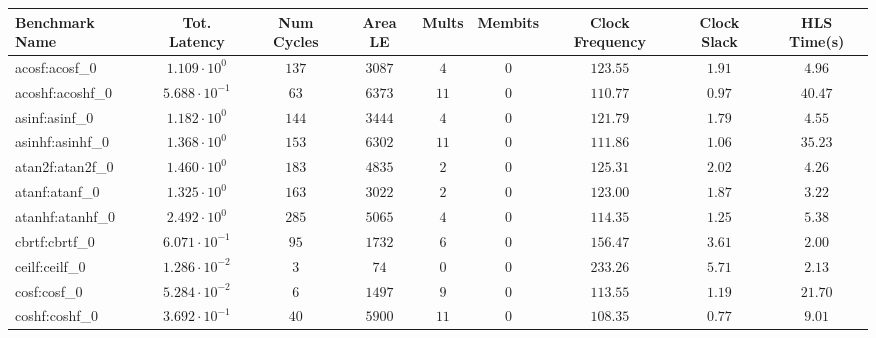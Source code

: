 \begin{tabular}{|l|c|c|c|c|c|c|c|c|}
\hline
Benchmark Name               & Tot. Latency            & Num Cycles & Area LE    & Mults   & Membits    & Clock Frequency & Clock Slack & HLS Time(s) \\
\hline
acosf:acosf\_0               & $ 1.109 \cdot 10^{0}  $ & $ 137    $ & $ 3087   $ & $ 4   $ & $ 0      $ & $ 123.55      $ & $ 1.91    $ & $ 4.96    $ \\
acoshf:acoshf\_0             & $ 5.688 \cdot 10^{-1} $ & $ 63     $ & $ 6373   $ & $ 11  $ & $ 0      $ & $ 110.77      $ & $ 0.97    $ & $ 40.47   $ \\
asinf:asinf\_0               & $ 1.182 \cdot 10^{0}  $ & $ 144    $ & $ 3444   $ & $ 4   $ & $ 0      $ & $ 121.79      $ & $ 1.79    $ & $ 4.55    $ \\
asinhf:asinhf\_0             & $ 1.368 \cdot 10^{0}  $ & $ 153    $ & $ 6302   $ & $ 11  $ & $ 0      $ & $ 111.86      $ & $ 1.06    $ & $ 35.23   $ \\
atan2f:atan2f\_0             & $ 1.460 \cdot 10^{0}  $ & $ 183    $ & $ 4835   $ & $ 2   $ & $ 0      $ & $ 125.31      $ & $ 2.02    $ & $ 4.26    $ \\
atanf:atanf\_0               & $ 1.325 \cdot 10^{0}  $ & $ 163    $ & $ 3022   $ & $ 2   $ & $ 0      $ & $ 123.00      $ & $ 1.87    $ & $ 3.22    $ \\
atanhf:atanhf\_0             & $ 2.492 \cdot 10^{0}  $ & $ 285    $ & $ 5065   $ & $ 4   $ & $ 0      $ & $ 114.35      $ & $ 1.25    $ & $ 5.38    $ \\
cbrtf:cbrtf\_0               & $ 6.071 \cdot 10^{-1} $ & $ 95     $ & $ 1732   $ & $ 6   $ & $ 0      $ & $ 156.47      $ & $ 3.61    $ & $ 2.00    $ \\
ceilf:ceilf\_0               & $ 1.286 \cdot 10^{-2} $ & $ 3      $ & $ 74     $ & $ 0   $ & $ 0      $ & $ 233.26      $ & $ 5.71    $ & $ 2.13    $ \\
cosf:cosf\_0                 & $ 5.284 \cdot 10^{-2} $ & $ 6      $ & $ 1497   $ & $ 9   $ & $ 0      $ & $ 113.55      $ & $ 1.19    $ & $ 21.70   $ \\
coshf:coshf\_0               & $ 3.692 \cdot 10^{-1} $ & $ 40     $ & $ 5900   $ & $ 11  $ & $ 0      $ & $ 108.35      $ & $ 0.77    $ & $ 9.01    $ \\

\end{tabular}
